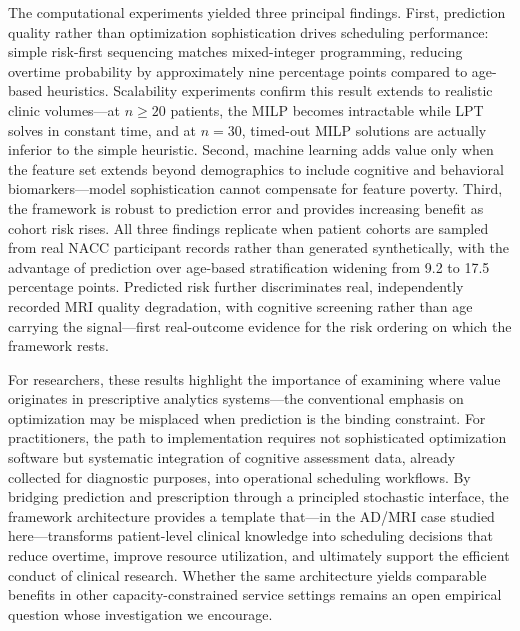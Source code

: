 \documentclass[11pt,a4paper]{article}
\newcommand{\rev}[1]{{\color{red}#1}}
\begin{document}
The computational experiments yielded three principal findings. First, prediction quality rather than optimization sophistication drives scheduling performance: simple risk-first sequencing matches mixed-integer programming, reducing overtime probability by approximately nine percentage points compared to age-based heuristics. Scalability experiments confirm this result extends to realistic clinic volumes---at $n \geq 20$ patients, the MILP becomes intractable while LPT solves in constant time, and at $n = 30$, timed-out MILP solutions are actually inferior to the simple heuristic. Second, machine learning adds value only when the feature set extends beyond demographics to include cognitive and behavioral biomarkers---model sophistication cannot compensate for feature poverty. Third, the framework is robust to prediction error and provides increasing benefit as cohort risk rises. \rev{All three findings replicate when patient cohorts are sampled from real NACC participant records rather than generated synthetically, with the advantage of prediction over age-based stratification widening from 9.2 to 17.5 percentage points. Predicted risk further discriminates real, independently recorded MRI quality degradation, with cognitive screening rather than age carrying the signal---first real-outcome evidence for the risk ordering on which the framework rests.}

For researchers, these results highlight the importance of examining where value originates in prescriptive analytics systems---the conventional emphasis on optimization may be misplaced when prediction is the binding constraint. For practitioners, the path to implementation requires not sophisticated optimization software but systematic integration of cognitive assessment data, already collected for diagnostic purposes, into operational scheduling workflows. By bridging prediction and prescription through a principled stochastic interface, the framework architecture provides a template that---in the AD/MRI case studied here---transforms patient-level clinical knowledge into scheduling decisions that reduce overtime, improve resource utilization, and ultimately support the efficient conduct of clinical research. Whether the same architecture yields comparable benefits in other capacity-constrained service settings remains an open empirical question whose investigation we encourage.

%
%
\end{document}
